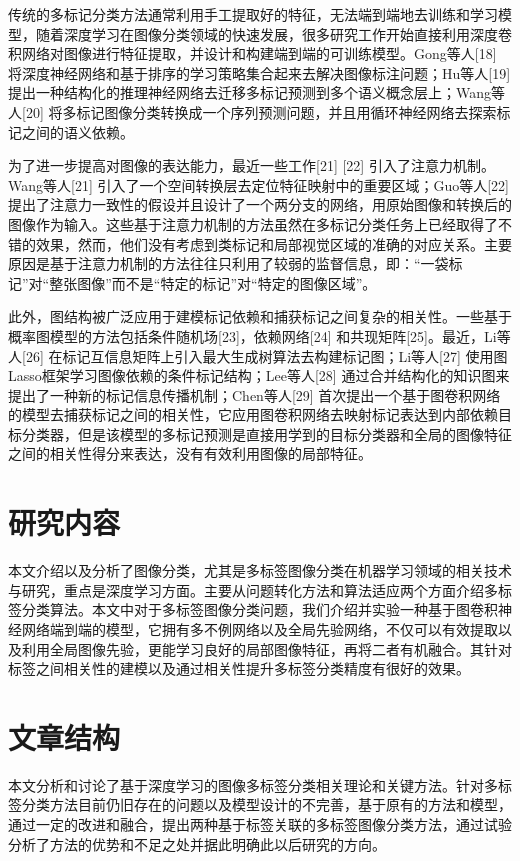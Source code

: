 传统的多标记分类方法通常利用手工提取好的特征，无法端到端地去训练和学习模型，随着深度学习在图像分类领域的快速发展，很多研究工作开始直接利用深度卷积网络对图像进行特征提取，并设计和构建端到端的可训练模型。Gong等人[18] 将深度神经网络和基于排序的学习策略集合起来去解决图像标注问题；Hu等人[19] 提出一种结构化的推理神经网络去迁移多标记预测到多个语义概念层上；Wang等人[20] 将多标记图像分类转换成一个序列预测问题，并且用循环神经网络去探索标记之间的语义依赖。

为了进一步提高对图像的表达能力，最近一些工作[21] [22] 引入了注意力机制。Wang等人[21] 引入了一个空间转换层去定位特征映射中的重要区域；Guo等人[22] 提出了注意力一致性的假设并且设计了一个两分支的网络，用原始图像和转换后的图像作为输入。这些基于注意力机制的方法虽然在多标记分类任务上已经取得了不错的效果，然而，他们没有考虑到类标记和局部视觉区域的准确的对应关系。主要原因是基于注意力机制的方法往往只利用了较弱的监督信息，即：“一袋标记”对“整张图像”而不是“特定的标记”对“特定的图像区域”。

此外，图结构被广泛应用于建模标记依赖和捕获标记之间复杂的相关性。一些基于概率图模型的方法包括条件随机场[23]，依赖网络[24] 和共现矩阵[25]。最近，Li等人[26] 在标记互信息矩阵上引入最大生成树算法去构建标记图；Li等人[27] 使用图Lasso框架学习图像依赖的条件标记结构；Lee等人[28] 通过合并结构化的知识图来提出了一种新的标记信息传播机制；Chen等人[29] 首次提出一个基于图卷积网络的模型去捕获标记之间的相关性，它应用图卷积网络去映射标记表达到内部依赖目标分类器，但是该模型的多标记预测是直接用学到的目标分类器和全局的图像特征之间的相关性得分来表达，没有有效利用图像的局部特征。

\section{研究内容}
本文介绍以及分析了图像分类，尤其是多标签图像分类在机器学习领域的相关技术与研究，重点是深度学习方面。主要从问题转化方法和算法适应两个方面介绍多标签分类算法。本文中对于多标签图像分类问题，我们介绍并实验一种基于图卷积神经网络端到端的模型，它拥有多不例网络以及全局先验网络，不仅可以有效提取以及利用全局图像先验，更能学习良好的局部图像特征，再将二者有机融合。其针对标签之间相关性的建模以及通过相关性提升多标签分类精度有很好的效果。

\section{文章结构}
本文分析和讨论了基于深度学习的图像多标签分类相关理论和关键方法。针对多标签分类方法目前仍旧存在的问题以及模型设计的不完善，基于原有的方法和模型，通过一定的改进和融合，提出两种基于标签关联的多标签图像分类方法，通过试验分析了方法的优势和不足之处并据此明确此以后研究的方向。
 
